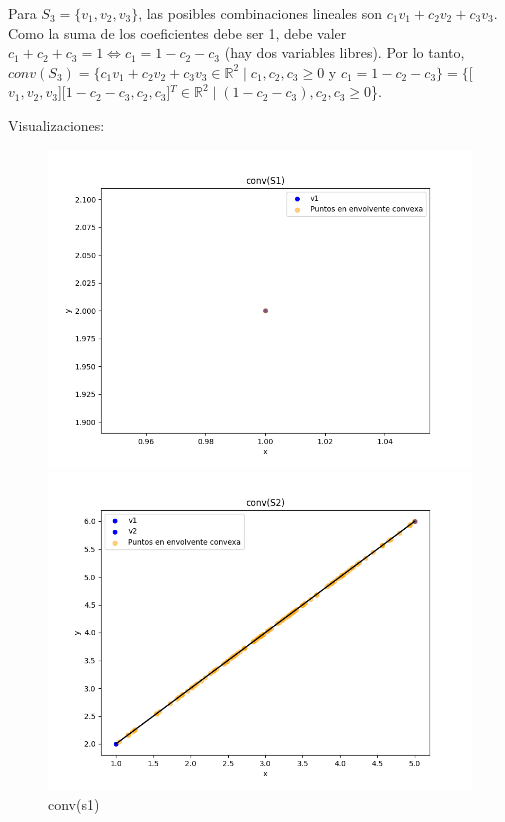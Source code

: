 \documentclass{article}
\begin{document}
Para $S_3 = \{v_1, v_2, v_3\}$, las posibles combinaciones lineales son $c_1 v_1 + c_2 v_2 + c_3 v_3$. Como la suma de los coeficientes debe ser 1, debe valer $c_1 + c_2 + c_3 = 1 \iff c_1 = 1 - c_2 - c_3$ (hay dos variables libres). Por lo tanto, $conv(S_3) = \{c_1 v_1+ c_2 v_2 + c_3 v_3\in \mathbb{R}^2 \mid c_1, c_2, c_3 \geq 0$ y $ c_1 = 1- c_2-c_3\} = \{$[$v_1, v_2, v_3$][$1-c_2 - c_3, c_2, c_3$]$^T\in \mathbb{R}^2 \mid (1 - c_2 - c_3), c_2, c_3 \geq 0$\}.

Visualizaciones:

\begin{figure}[H]
   \centering
    \begin{minipage}{0.45\textwidth}
        \centering
        \includegraphics[width=\textwidth]{imagenes/conv(s1).png}
        \caption{conv(s1)}
        \label{fig:grafico1}
    \end{minipage}
    \hfill
    \begin{minipage}{0.45\textwidth}
        \centering
        \includegraphics[width=\textwidth]{imagenes/conv(s2).png}

\end{minipage}
\end{figure}
\end{document}
